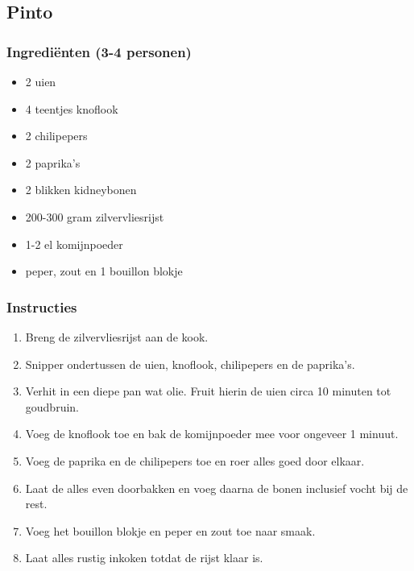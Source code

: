 \subsection{Pinto}

\subsubsection*{Ingrediënten (3-4 personen)}
\begin{multicols}{2}
    \begin{itemize}
        \item 2 uien
        \item 4 teentjes knoflook
        \item 2 chilipepers
        \item 2 paprika's
        \item 2 blikken kidneybonen
        \item 200-300 gram zilvervliesrijst
        \item 1-2 el komijnpoeder
        \item peper, zout en 1 bouillon blokje
    \end{itemize}
\end{multicols}

\subsubsection*{Instructies}
\begin{multicols}{2}
    \begin{enumerate}
        \item Breng de zilvervliesrijst aan de kook.
        \item Snipper ondertussen de uien, knoflook, chilipepers en de paprika's.
        \item Verhit in een diepe pan wat olie. Fruit hierin de uien circa 10 minuten tot goudbruin.
        \item Voeg de knoflook toe en bak de komijnpoeder mee voor ongeveer 1 minuut.
        \item Voeg de paprika en de chilipepers toe en roer alles goed door elkaar.
        \item Laat de alles even doorbakken en voeg daarna de bonen inclusief vocht bij de rest.
        \item Voeg het bouillon blokje en peper en zout toe naar smaak.
        \item Laat alles rustig inkoken totdat de rijst klaar is.
    \end{enumerate}
\end{multicols}